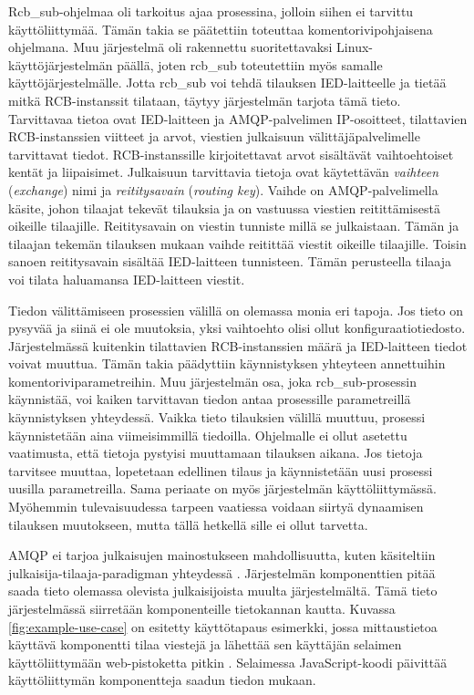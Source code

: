 Rcb\_sub-ohjelmaa oli tarkoitus ajaa prosessina, jolloin siihen ei tarvittu käyttöliittymää. Tämän takia se päätettiin toteuttaa komentorivipohjaisena ohjelmana. Muu järjestelmä oli rakennettu suoritettavaksi Linux-käyttöjärjestelmän päällä, joten rcb\_sub toteutettiin myös samalle käyttöjärjestelmälle. Jotta rcb\_sub voi tehdä tilauksen IED-laitteelle ja tietää mitkä RCB-instanssit tilataan, täytyy järjestelmän tarjota tämä tieto. Tarvittavaa tietoa ovat IED-laitteen ja AMQP-palvelimen IP-osoitteet, tilattavien RCB-instanssien viitteet ja arvot, viestien julkaisuun välittäjäpalvelimelle tarvittavat tiedot. RCB-instanssille kirjoitettavat arvot sisältävät vaihtoehtoiset kentät ja liipaisimet. Julkaisuun tarvittavia tietoja ovat käytettävän \emph{vaihteen} (\emph{exchange}) nimi ja \emph{reititysavain} (\emph{routing key}). Vaihde on AMQP-palvelimella käsite, johon tilaajat tekevät tilauksia ja on vastuussa viestien reitittämisestä oikeille tilaajille. Reititysavain on viestin tunniste millä se julkaistaan. Tämän ja tilaajan tekemän tilauksen mukaan vaihde reitittää viestit oikeille tilaajille. Toisin sanoen reititysavain sisältää IED-laitteen tunnisteen. Tämän perusteella tilaaja voi tilata haluamansa IED-laitteen viestit.

Tiedon välittämiseen prosessien välillä on olemassa monia eri tapoja. Jos tieto on pysyvää ja siinä ei ole muutoksia, yksi vaihtoehto olisi ollut konfiguraatiotiedosto. Järjestelmässä kuitenkin tilattavien RCB-instanssien määrä ja IED-laitteen tiedot voivat muuttua. Tämän takia päädyttiin käynnistyksen yhteyteen annettuihin komentoriviparametreihin. Muu järjestelmän osa, joka rcb\_sub-prosessin käynnistää, voi kaiken tarvittavan tiedon antaa prosessille parametreillä käynnistyksen yhteydessä. Vaikka tieto tilauksien välillä muuttuu, prosessi käynnistetään aina viimeisimmillä tiedoilla. Ohjelmalle ei ollut asetettu vaatimusta, että tietoja pystyisi muuttamaan tilauksen aikana. Jos tietoja tarvitsee muuttaa, lopetetaan edellinen tilaus ja käynnistetään uusi prosessi uusilla parametreilla. Sama periaate on myös järjestelmän käyttöliittymässä. Myöhemmin tulevaisuudessa tarpeen vaatiessa voidaan siirtyä dynaamisen tilauksen muutokseen, mutta tällä hetkellä sille ei ollut tarvetta.

AMQP ei tarjoa julkaisujen mainostukseen mahdollisuutta, kuten käsiteltiin julkaisija-tilaaja-paradigman yhteydessä \cite{AMQP-specification}. Järjestelmän komponenttien pitää saada tieto olemassa olevista julkaisijoista muulta järjestelmältä. Tämä tieto järjestelmässä siirretään komponenteille tietokannan kautta. Kuvassa \ref{fig:example-use-case} on esitetty käyttötapaus esimerkki, jossa mittaustietoa käyttävä komponentti tilaa viestejä ja lähettää sen käyttäjän selaimen käyttöliittymään web-pistoketta pitkin \cite{websocket}. Selaimessa JavaScript-koodi päivittää käyttöliittymän komponentteja saadun tiedon mukaan.


